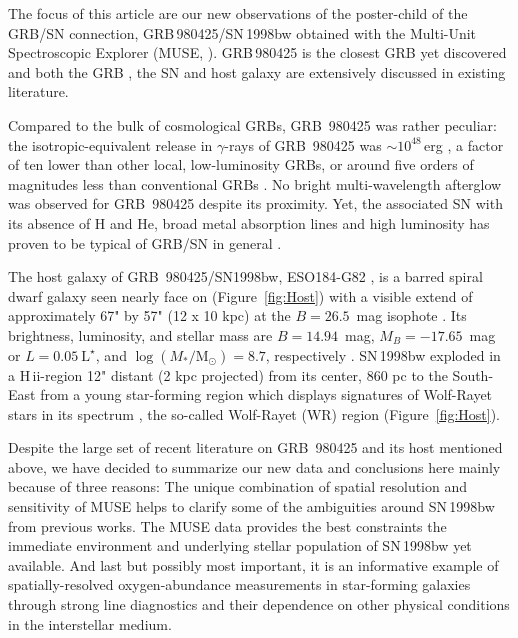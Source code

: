 \documentclass[traditabstract]{aa}
\newcommand{\hii}{\mbox{H\,{\sc ii}}}
\begin{document}
The focus of this article are our new observations of the poster-child of the GRB/SN connection, GRB\,980425/SN\,1998bw obtained with the Multi-Unit Spectroscopic Explorer (MUSE, \citealp{2010SPIE.7735E..08B}). GRB\,980425 is the closest GRB yet discovered and both the GRB \citep[e.g.][]{1998Natur.395..670G, 1998Natur.395..663K}, the SN \citep[e.g.][]{1998Natur.395..672I, 2001ApJ...555..900P, 2006ApJ...640..854M} and host galaxy \citep[e.g.][]{2000ApJ...542L..89F, 2005NewA...11..103S, 2006A&A...454..103H, 2009ApJ...693..347M} are extensively discussed in existing literature. 

Compared to the bulk of cosmological GRBs, GRB~980425 was rather peculiar: the isotropic-equivalent release in $\gamma$-rays of GRB~980425 was $\sim10^{48}$\,erg \citep{1998Natur.395..670G}, a factor of ten lower than other local, low-luminosity GRBs, or around five orders of magnitudes less than conventional GRBs \citep{2013ApJ...776...98X}. No bright multi-wavelength afterglow was observed for GRB~980425 despite its proximity. Yet, the associated SN with its absence of H and He, broad metal absorption lines and high luminosity has proven to be typical of GRB/SN in general \citep{2012grbu.book..169H}.

The host galaxy of GRB~980425/SN1998bw, ESO184-G82 \citep{1989spce.book.....L}, is a barred spiral dwarf galaxy \citep{2000ApJ...542L..89F} seen nearly face on (Figure~\ref{fig:Host}) with a visible extend of approximately 67" by 57" (12 x 10 kpc) at the $B=26.5$~mag isophote \citep{2005NewA...11..103S}. Its brightness, luminosity, and stellar mass are $B=14.94$~mag, $M_B=-17.65$~mag or $L=0.05~\mathrm{L}^{\star}$, and $\log (M_{*}/\mathrm{M}_{\odot})= 8.7 $, respectively \citep{2005NewA...11..103S, 2014A&A...562A..70M}. SN\,1998bw exploded in a \hii-region 12" distant (2 kpc projected) from its center, 860 pc to the South-East from a young star-forming region which displays signatures of Wolf-Rayet stars in its spectrum \citep{2006A&A...454..103H}, the so-called Wolf-Rayet (WR) region (Figure~\ref{fig:Host}).

Despite the large set of recent literature on GRB~980425 and its host mentioned above, we have decided to summarize our new data and conclusions here mainly because of three reasons: The unique combination of spatial resolution and sensitivity of MUSE helps to clarify some of the ambiguities around SN\,1998bw from previous works. The MUSE data provides the best constraints the immediate environment and underlying stellar population of SN\,1998bw yet available. And last but possibly most important, it is an informative example of spatially-resolved oxygen-abundance measurements in star-forming galaxies through strong line diagnostics and their dependence on other physical conditions in the interstellar medium.
\end{document}
